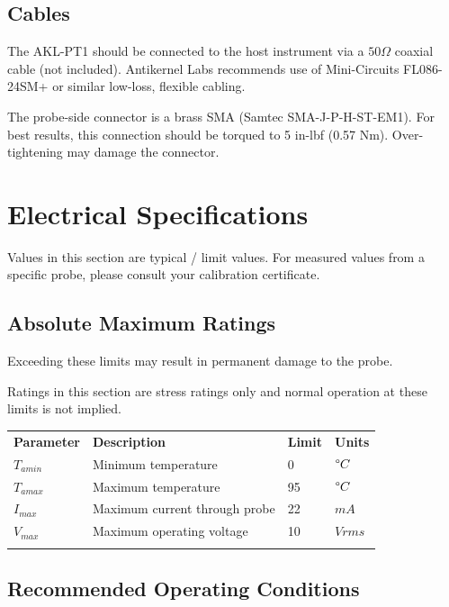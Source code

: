 \documentclass[11pt]{article}
\newcommand{\thinhline}{\Xhline{1\arrayrulewidth}}
\newcommand{\thickhline}{\Xhline{2.5\arrayrulewidth}}
\begin{document}
\FloatBarrier
\subsection{Cables}

The AKL-PT1 should be connected to the host instrument via a $50 \Omega$ coaxial cable (not included). Antikernel Labs
recommends use of Mini-Circuits FL086-24SM+ or similar low-loss, flexible cabling.

The probe-side connector is a brass SMA (Samtec SMA-J-P-H-ST-EM1). For best results, this connection should be torqued
to 5 in-lbf (0.57 Nm). Over-tightening may damage the connector.

\pagebreak
\section{Electrical Specifications}

Values in this section are typical / limit values. For measured values from a specific probe, please consult your
calibration certificate.


\subsection{Absolute Maximum Ratings}

Exceeding these limits may result in permanent damage to the probe.

Ratings in this section are stress ratings only and normal operation at these limits is not implied.

\begin{tabularx}{16cm}{lXll}
\thickhline
\textbf{Parameter} & \textbf{Description} & \textbf{Limit} & \textbf{Units} \\
\thickhline
$T_{amin}$ & Minimum temperature & 0 & $ \degree C$ \\
\thinhline
$T_{amax}$ & Maximum temperature & 95 & $ \degree C$ \\
\thinhline
$I_{max}$ & Maximum current through probe & 22 & $ mA $ \\
\thinhline
$V_{max}$ & Maximum operating voltage & 10 & $ Vrms $ \\
\thickhline
\end{tabularx}

\subsection{Recommended Operating Conditions}
\end{document}
